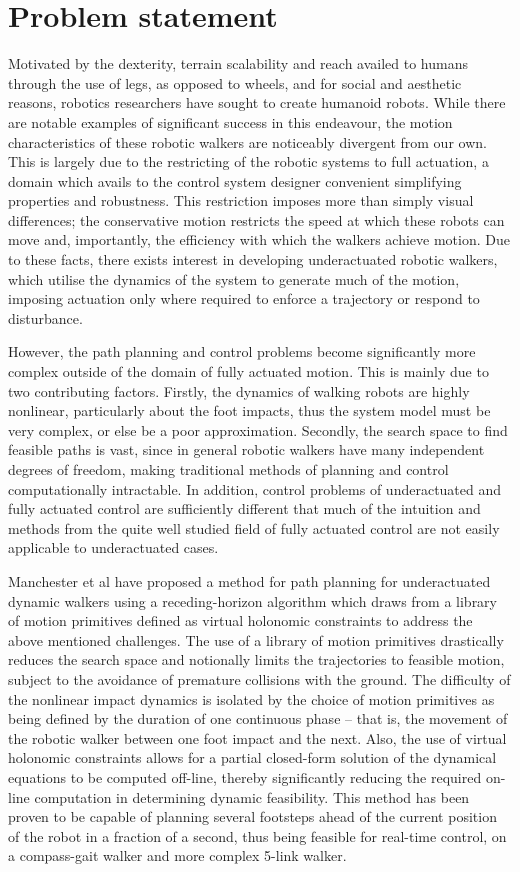 \section{Problem statement}
Motivated by the dexterity, terrain scalability and reach availed to humans through the use of legs, as opposed to wheels, and for social and aesthetic reasons, robotics researchers have sought to create humanoid robots. While there are notable examples of significant success in this endeavour, the motion characteristics of these robotic walkers are noticeably divergent from our own. This is largely due to the restricting of the robotic systems to full actuation, a domain which avails to the control system designer convenient simplifying properties and robustness. This restriction imposes more than simply visual differences; the conservative motion restricts the speed at which these robots can move and, importantly, the efficiency with which the walkers achieve motion. Due to these facts, there exists interest in developing underactuated robotic walkers, which utilise the dynamics of the system to generate much of the motion, imposing actuation only where required to enforce a trajectory or respond to disturbance.

However, the path planning and control problems become significantly more complex outside of the domain of fully actuated motion. This is mainly due to two contributing factors. Firstly, the dynamics of walking robots are highly nonlinear, particularly about the foot impacts, thus the system model must be very complex, or else be a poor approximation. Secondly, the search space to find feasible paths is vast, since in general robotic walkers have many independent degrees of freedom, making traditional methods of planning and control computationally intractable. In addition, control problems of underactuated and fully actuated control are sufficiently different that much of the intuition and methods from the quite well studied field of fully actuated control are not easily applicable to underactuated cases.

Manchester et al \cite{manchester13planning} have proposed a method for path planning for underactuated dynamic walkers using a receding-horizon algorithm which draws from a library of motion primitives defined as virtual holonomic constraints to address the above mentioned challenges. The use of a library of motion primitives drastically reduces the search space and notionally limits the trajectories to feasible motion, subject to the avoidance of premature collisions with the ground. The difficulty of the nonlinear impact dynamics is isolated by the choice of motion primitives as being defined by the duration of one continuous phase – that is, the movement of the robotic walker between one foot impact and the next. Also, the use of virtual holonomic constraints allows for a partial closed-form solution of the dynamical equations to be computed off-line, thereby significantly reducing the required on-line computation in determining dynamic feasibility. This method has been proven to be capable of planning several footsteps ahead of the current position of the robot in a fraction of a second, thus being feasible for real-time control, on a compass-gait walker and more complex 5-link walker.

